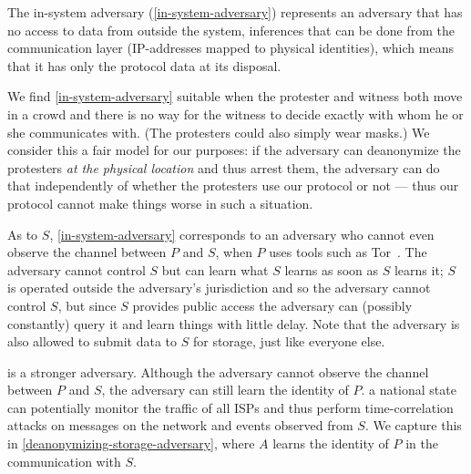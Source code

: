 The in-system adversary (\cref{in-system-adversary}) represents an adversary 
that has no access to data from outside the system, \eg inferences that can be 
done from the communication layer (\eg IP-addresses mapped to physical 
identities), which means that it has only the protocol data at its disposal.

We find \cref{in-system-adversary} suitable when the protester and witness both 
move in a crowd and there is no way for the witness to decide exactly with whom 
he or she communicates with.
(The protesters could also simply wear masks.)
We consider this a fair model for our purposes: if the adversary can 
deanonymize the protesters \emph{at the physical location} and thus arrest 
them, the adversary can do that independently of whether the protesters use our 
protocol or not --- thus our protocol cannot make things worse in such a 
situation.

As to \(S\), \cref{in-system-adversary} corresponds to an adversary who cannot 
even observe the channel between \(P\) and \(S\), \eg when \(P\) uses tools 
such as Tor~\cite{Tor}.
The adversary cannot control \(S\) but can learn what \(S\) learns as soon as 
\(S\) learns it; \eg \(S\) is operated outside the adversary's jurisdiction and 
so the adversary cannot control \(S\), but since \(S\) provides public access 
the adversary can (possibly constantly) query it and learn things with little 
delay.
Note that the adversary is also allowed to submit data to \(S\) for storage, 
just like everyone else.

 is a stronger adversary.
Although the adversary cannot observe the channel between \(P\) and \(S\), the 
adversary can still learn the identity of \(P\).
\Eg a national state can potentially monitor the traffic of all \acp{ISP} and 
thus perform time-correlation attacks on messages on the network and events 
observed from \(S\).
We capture this in \cref{deanonymizing-storage-adversary}, where \(A\) learns 
the identity of \(P\) in the communication with \(S\).

